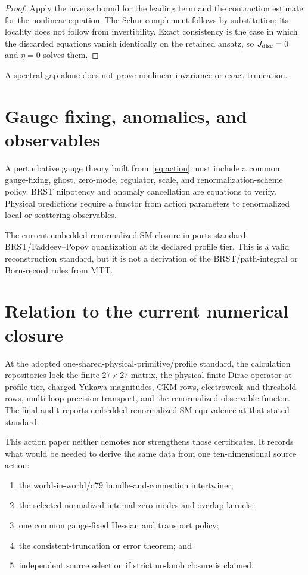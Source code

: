 \documentclass[11pt]{article}
\begin{document}
\begin{proof}
Apply the inverse bound for the leading term and the contraction estimate
for the nonlinear equation. The Schur complement follows by substitution;
its locality does not follow from invertibility. Exact consistency is the
case in which the discarded equations vanish identically on the retained
ansatz, so $J_{\rm disc}=0$ and $\eta=0$ solves them.
\end{proof}

A spectral gap alone does not prove nonlinear invariance or exact truncation.

\section{Gauge fixing, anomalies, and observables}

A perturbative gauge theory built from~\eqref{eq:action} must include a common
gauge-fixing, ghost, zero-mode, regulator, scale, and renormalization-scheme
policy.  BRST nilpotency and anomaly cancellation are equations to verify.
Physical predictions require a functor from action parameters to renormalized
local or scattering observables.

The current embedded-renormalized-SM closure imports standard
BRST/Faddeev--Popov quantization at its declared profile tier.  This is a valid
reconstruction standard, but it is not a derivation of the BRST/path-integral
or Born-record rules from MTT.

\section{Relation to the current numerical closure}

At the adopted one-shared-physical-primitive/profile standard, the calculation
repositories lock the finite $27\times27$ matrix, the physical finite Dirac
operator at profile tier, charged Yukawa magnitudes, CKM rows, electroweak and
threshold rows, multi-loop precision transport, and the renormalized
observable functor.  The final audit reports embedded renormalized-SM
equivalence at that stated standard.

This action paper neither demotes nor strengthens those certificates.  It
records what would be needed to derive the same data from one ten-dimensional
source action:
\begin{enumerate}
\item the world-in-world/q79 bundle-and-connection intertwiner;
\item the selected normalized internal zero modes and overlap kernels;
\item one common gauge-fixed Hessian and transport policy;
\item the consistent-truncation or error theorem; and
\item independent source selection if strict no-knob closure is claimed.
\end{enumerate}
\end{document}
